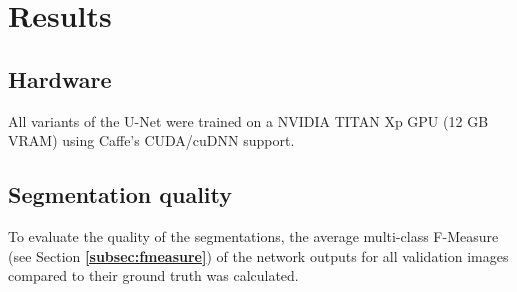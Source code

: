 \chapter {Results}
\label{chap:results}

	\section{Hardware}
All variants of the U-Net were trained on a NVIDIA TITAN Xp GPU (12 GB VRAM) using Caffe's CUDA/cuDNN support.

	\section {Segmentation quality}

To evaluate the quality of the segmentations, the average multi-class F-Measure (see Section \textbf{\ref{subsec:fmeasure}}) of the network outputs for all validation images compared to their ground truth was calculated.\\

